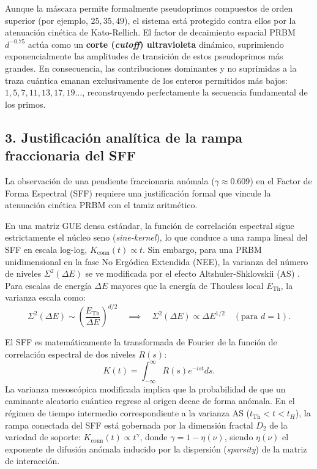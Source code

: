 \documentclass[aps,prl,preprint,superscriptaddress,floatfix]{revtex4-2}
\begin{document}
Aunque la máscara permite formalmente pseudoprimos compuestos de orden superior (por ejemplo, $25, 35, 49$), el sistema está protegido contra ellos por la atenuación cinética de Kato-Rellich. El factor de decaimiento espacial PRBM $d^{-0.75}$ actúa como un \textbf{corte (\textit{cutoff}) ultravioleta} dinámico, suprimiendo exponencialmente las amplitudes de transición de estos pseudoprimos más grandes. En consecuencia, las contribuciones dominantes y no suprimidas a la traza cuántica emanan exclusivamente de los enteros permitidos más bajos: $1, 5, 7, 11, 13, 17, 19 \dots$, reconstruyendo perfectamente la secuencia fundamental de los primos.

\subsection{3. Justificación analítica de la rampa fraccionaria del SFF}
La observación de una pendiente fraccionaria anómala ($\gamma \approx 0.609$) en el Factor de Forma Espectral (SFF) requiere una justificación formal que vincule la atenuación cinética PRBM con el tamiz aritmético. 

En una matriz GUE densa estándar, la función de correlación espectral sigue estrictamente el núcleo seno (\textit{sine-kernel}), lo que conduce a una rampa lineal del SFF en escala log-log, $K_{\text{conn}}(t) \propto t$. Sin embargo, para una PRBM unidimensional en la fase No Ergódica Extendida (NEE), la varianza del número de niveles $\Sigma^2(\Delta E)$ se ve modificada por el efecto Altshuler-Shklovskii (AS) \cite{Erdos2013, Erdos2015}. Para escalas de energía $\Delta E$ mayores que la energía de Thouless local $E_{\text{Th}}$, la varianza escala como:
\begin{equation}
\Sigma^2(\Delta E) \sim \left(\frac{E_{\text{Th}}}{\Delta E}\right)^{d/2} \quad \implies \quad \Sigma^2(\Delta E) \propto \Delta E^{1/2} \quad (\text{para } d=1).
\end{equation}

El SFF es matemáticamente la transformada de Fourier de la función de correlación espectral de dos niveles $R(s)$:
\begin{equation}
K(t) = \int_{-\infty}^{\infty} R(s) e^{-ist} ds.
\end{equation}
La varianza mesoscópica modificada implica que la probabilidad de que un caminante aleatorio cuántico regrese al origen decae de forma anómala. En el régimen de tiempo intermedio correspondiente a la varianza AS ($t_{\text{Th}} < t < t_H$), la rampa conectada del SFF está gobernada por la dimensión fractal $D_2$ de la variedad de soporte: $K_{\text{conn}}(t) \propto t^{\gamma}$, donde $\gamma = 1 - \eta(\nu)$, siendo $\eta(\nu)$ el exponente de difusión anómala inducido por la dispersión (\textit{sparsity}) de la matriz de interacción. 
\end{document}
